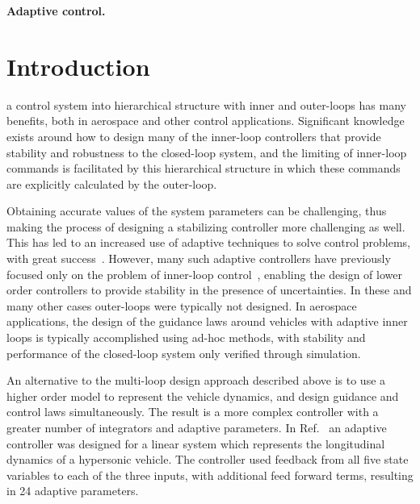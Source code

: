 \documentclass[journal]{IEEEtran}
\theoremstyle{innercustomthm}
\begin{document}
  \begin{IEEEkeywords}
    \bfseries
    Adaptive control.
  \end{IEEEkeywords}

  \IEEEpeerreviewmaketitle%

  \section{Introduction}\label{sec.intro}

   a control system into hierarchical structure with inner and outer-loops has many benefits, both in aerospace and other control applications.
  Significant knowledge exists around how to design many of the inner-loop controllers that provide stability and robustness to the closed-loop system, and the limiting of inner-loop commands is facilitated by this hierarchical structure in which these commands are explicitly calculated by the outer-loop.

  Obtaining accurate values of the system parameters can be challenging, thus making the process of designing a stabilizing controller more challenging as well.
  This has led to an increased use of adaptive techniques to solve control problems, with great success\ \cite{astrom.feedback.1987, lavretskywise.book.2013}.
  However, many such adaptive controllers have previously focused only on the problem of inner-loop control\ \cite{mcfarland.autopilot.1996, qu.gnc.2013, wiese.adaptive.2013, wiese.gnc.2015, wiese.jgcd.2015, wise.munition.2005, wise.autopilot.2008}, enabling the design of lower order controllers to provide stability in the presence of uncertainties.
  In these and many other cases outer-loops were typically not designed.
  In aerospace applications, the design of the guidance laws around vehicles with adaptive inner loops is typically accomplished using ad-hoc methods, with stability and performance of the closed-loop system only verified through simulation.

  An alternative to the multi-loop design approach described above is to use a higher order model to represent the vehicle dynamics, and design guidance and control laws simultaneously.
  The result is a more complex controller with a greater number of integrators and adaptive parameters.
  In Ref.\ \cite{gibson.adaptive.2008} an adaptive controller was designed for a linear system which represents the longitudinal dynamics of a hypersonic vehicle.
  The controller used feedback from all five state variables to each of the three inputs, with additional feed forward terms, resulting in 24 adaptive parameters.
\end{document}
